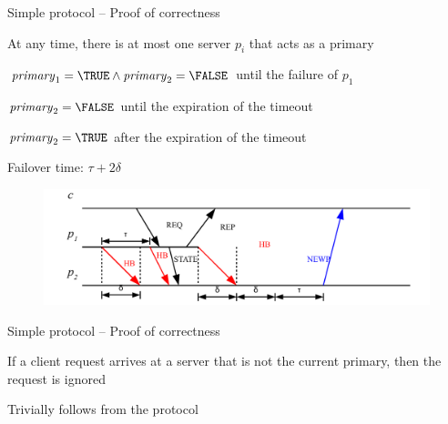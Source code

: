 \begin{frame}{Simple protocol -- Proof of correctness}
	
\BIL
\item[PB1] At any time, there is \alert{at most} one server $p_i$ that
  acts as a primary
\item[Proof]
\BI
\item $\isPrimary_1 = \TRUE \wedge \isPrimary_2 = \FALSE$ until the failure of $p_1$
\item $\isPrimary_2 = \FALSE$ until the expiration of the timeout
\item $\isPrimary_2 = \TRUE$ after the expiration of the timeout
\item Failover time: $\tau + 2\delta$
\EI
\EIL

\begin{figure}
	\includegraphics[width=1.0\textwidth]{pb1}
\end{figure}

\end{frame}

\begin{frame}{Simple protocol -- Proof of correctness}
	
\BIL
\item[PB2] If a client request arrives at a server that is not the current primary, then the request is ignored
\item[Proof] Trivially follows from the protocol	
\EIL

\end{frame}

